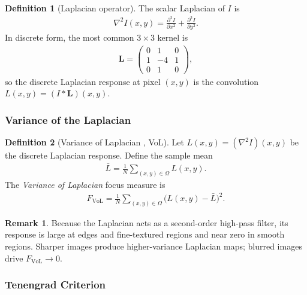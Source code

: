 \documentclass[12pt, xcolor=dvipsnames,svgnames,x11names]{article}
\theoremstyle{definition}
\newtheorem{definition}{Definition}[section]
\newtheorem{remark}{Remark}[section]
\begin{document}
\begin{definition}[Laplacian operator]
The scalar Laplacian of $I$ is
\begin{align*}
  \nabla^2 I(x,y) = \frac{\partial^2 I}{\partial x^2}
                         + \frac{\partial^2 I}{\partial y^2}.
\end{align*}
In discrete form, the most common $3\times3$ kernel is
\begin{align*}
  \mathbf{L} =
  \begin{pmatrix}
    0 & 1 & 0 \\
    1 & {-4} & 1 \\
    0 & 1 & 0
  \end{pmatrix},
\end{align*}
so the discrete Laplacian response at pixel $(x,y)$ is the convolution
$L(x,y) = (I * \mathbf{L})(x,y)$.
\end{definition}

\subsubsection{Variance of the Laplacian}

\begin{definition}[Variance of Laplacian ,  VoL]
Let $L(x,y) = (\nabla^2 I)(x,y)$ be the discrete Laplacian response.
Define the sample mean
\begin{align*}
  \bar{L} = \frac{1}{N} \sum_{(x,y)\in\Omega} L(x,y).
\end{align*}
The \emph{Variance of Laplacian} focus measure is
\begin{align*}
  \boxed{F_{\mathrm{VoL}} =
    \frac{1}{N}\sum_{(x,y)\in\Omega} \bigl(L(x,y) - \bar{L}\bigr)^2.}
\end{align*}
\end{definition}

\begin{remark}
Because the Laplacian acts as a second-order high-pass filter, its response is
large at edges and fine-textured regions and near zero in smooth regions.
Sharper images produce higher-variance Laplacian maps; blurred images drive
$F_{\mathrm{VoL}} \to 0$.
\end{remark}

\subsubsection{Tenengrad Criterion}
\end{document}
